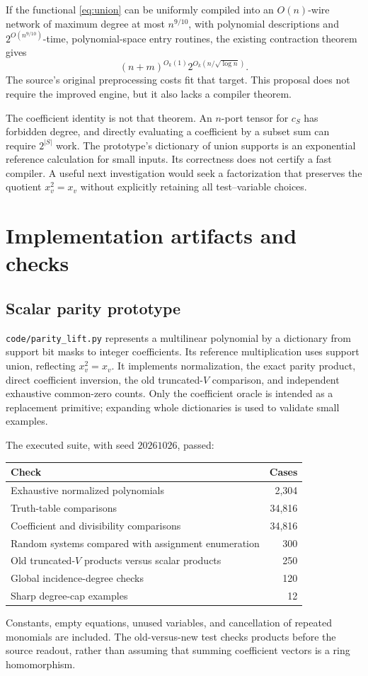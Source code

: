 \documentclass[11pt]{article}
\theoremstyle{definition}
\theoremstyle{remark}
\begin{document}
If the functional \eqref{eq:union} can be uniformly compiled into an
$O(n)$-wire network of maximum degree at most $n^{9/10}$, with polynomial
descriptions and $2^{O(n^{9/10})}$-time, polynomial-space entry routines,
the existing contraction theorem gives
\[
 (n+m)^{O_k(1)}2^{O_k(n/\sqrt{\log n})}.
\]
The source's original preprocessing costs fit that target. This proposal
does not require the improved engine, but it also lacks a compiler theorem.

The coefficient identity is not that theorem. An $n$-port tensor for $c_S$
has forbidden degree, and directly evaluating a coefficient by a subset sum
can require $2^{|S|}$ work. The prototype's dictionary of union supports
is an exponential reference calculation for small inputs. Its correctness
does not certify a fast compiler. A useful next investigation would seek a
factorization that preserves the quotient $x_v^2=x_v$ without explicitly
retaining all test--variable choices.

\section{Implementation artifacts and checks}\label{sec:checks}

\subsection{Scalar parity prototype}
\texttt{code/parity\_lift.py} represents a multilinear polynomial by a
dictionary from support bit masks to integer coefficients. Its reference
multiplication uses support union, reflecting $x_v^2=x_v$. It implements
normalization, the exact parity product, direct coefficient inversion, the
old truncated-$V$ comparison, and independent exhaustive common-zero counts.
Only the coefficient oracle is intended as a replacement primitive; expanding
whole dictionaries is used to validate small examples.

The executed suite, with seed $20261026$, passed:
\begin{center}\small
\begin{tabular}{@{}lr@{}}
\toprule
Check & Cases \\
\midrule
Exhaustive normalized polynomials & 2,304 \\
Truth-table comparisons & 34,816 \\
Coefficient and divisibility comparisons & 34,816 \\
Random systems compared with assignment enumeration & 300 \\
Old truncated-$V$ products versus scalar products & 250 \\
Global incidence-degree checks & 120 \\
Sharp degree-cap examples & 12 \\
\bottomrule
\end{tabular}
\end{center}
Constants, empty equations, unused variables, and cancellation of repeated
monomials are included. The old-versus-new test checks products before the
source readout, rather than assuming that summing coefficient vectors is a
ring homomorphism.
\end{document}
